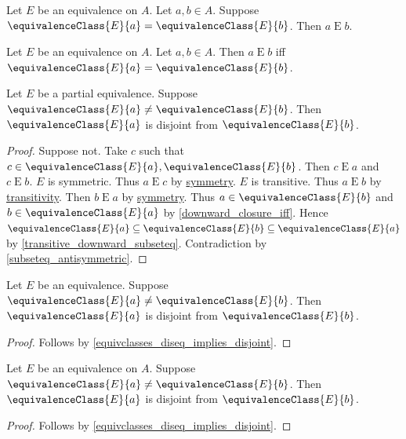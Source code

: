 \begin{proposition}\label{equivclasses_eq_implies_equiv}
    Let $E$ be an equivalence on $A$.
    Let $a, b\in A$.
    Suppose $\equivalenceClass{E}{a} = \equivalenceClass{E}{b}$.
    Then $a\mathrel{E} b$.
\end{proposition}

\begin{proposition}\label{equiv_iff_equivclasses_eq}
    Let $E$ be an equivalence on $A$.
    Let $a, b\in A$.
    Then $a\mathrel{E} b$ iff $\equivalenceClass{E}{a} = \equivalenceClass{E}{b}$.
\end{proposition}

\begin{proposition}\label{equivclasses_diseq_implies_disjoint}
    Let $E$ be a partial equivalence.
    Suppose $\equivalenceClass{E}{a}\neq \equivalenceClass{E}{b}$.
    Then $\equivalenceClass{E}{a}$ is disjoint from $\equivalenceClass{E}{b}$.
\end{proposition}
\begin{proof}
    Suppose not.
    Take $c$ such that $c\in \equivalenceClass{E}{a},\equivalenceClass{E}{b}$.
    Then $c\mathrel{E} a$ and
         $c\mathrel{E} b$.
    $E$ is symmetric.
    Thus $a\mathrel{E} c$ by \hyperref[symmetric]{symmetry}.
    $E$ is transitive.
    Thus $a\mathrel{E} b$ by \hyperref[transitive]{transitivity}.
    Then $b\mathrel{E} a$ by \hyperref[symmetric]{symmetry}.
    Thus $a\in \equivalenceClass{E}{b}$ and $b\in \equivalenceClass{E}{a}$
        by \cref{downward_closure_iff}.
    Hence $\equivalenceClass{E}{a}\subseteq \equivalenceClass{E}{b}\subseteq \equivalenceClass{E}{a}$
        by \cref{transitive_downward_subseteq}.
    Contradiction by \cref{subseteq_antisymmetric}.
\end{proof}

\begin{corollary}\label{equivalence_equivclasses_diseq_implies_disjoint}
    Let $E$ be an equivalence.
    Suppose $\equivalenceClass{E}{a}\neq \equivalenceClass{E}{b}$.
    Then $\equivalenceClass{E}{a}$ is disjoint from $\equivalenceClass{E}{b}$.
\end{corollary}
\begin{proof}
    Follows by \cref{equivclasses_diseq_implies_disjoint}.
\end{proof}

\begin{corollary}\label{equivalenceon_equivclasses_diseq_implies_disjoint}
    Let $E$ be an equivalence on $A$.
    Suppose $\equivalenceClass{E}{a}\neq \equivalenceClass{E}{b}$.
    Then $\equivalenceClass{E}{a}$ is disjoint from $\equivalenceClass{E}{b}$.
\end{corollary}
\begin{proof}
    Follows by \cref{equivclasses_diseq_implies_disjoint}.
\end{proof}


